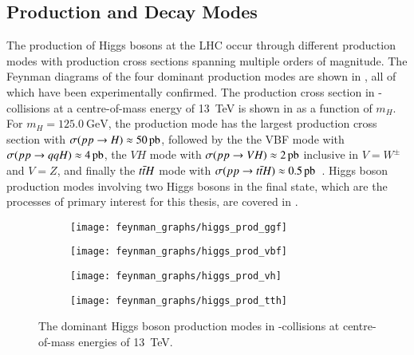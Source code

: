 \subsection{Production and Decay Modes}

The production of Higgs bosons at the LHC occur through different production
modes with production cross sections spanning multiple orders of magnitude. The
Feynman diagrams of the four dominant production modes are shown in
, all of which have been experimentally confirmed. The
production cross section in \pp-collisions at a centre-of-mass energy of
\SI{13}{\TeV} is shown in  as a function of
$m_{H}$. For $m_{H} = \SI{125.0}{\GeV}$, the \ggF production mode has the
largest production cross section with
$\sigma(\pp \to H) \approx \SI{50}{\pico\barn}$, followed by the the VBF mode
with $\sigma(\pp \to qqH) \approx \SI{4}{\pico\barn}$, the $VH$ mode with
$\sigma(\pp \to VH) \approx \SI{2}{\pico\barn}$ inclusive in $V = W^\pm$ and
$V= Z$, and finally the $t\bar{t} H$ mode with
$\sigma(\pp \to \ttbar H) \approx
\SI{0.5}{\pico\barn}$~\cite{deFlorian:2016spz}. Higgs boson production modes
involving two Higgs bosons in the final state, which are the processes of
primary interest for this thesis, are covered in
.

\begin{figure}[htbp]
  \centering

  \begin{subfigure}{0.48\textwidth}
    \centering
    \texttt{[image: feynman\_graphs/higgs\_prod\_ggf]}
  \end{subfigure}%
  \begin{subfigure}{0.48\textwidth}
    \centering
    \texttt{[image: feynman\_graphs/higgs\_prod\_vbf]}
  \end{subfigure}

  \vspace*{0.5em}

  \begin{subfigure}{0.48\textwidth}
    \centering
    \texttt{[image: feynman\_graphs/higgs\_prod\_vh]}
  \end{subfigure}%
  \begin{subfigure}{0.48\textwidth}
    \centering
    \texttt{[image: feynman\_graphs/higgs\_prod\_tth]}
  \end{subfigure}%

  \caption{The dominant Higgs boson production modes in \pp-collisions at
    centre-of-mass energies of \SI{13}{\TeV}.}%
  \label{fig:higgs_prod_feyn}
\end{figure}

